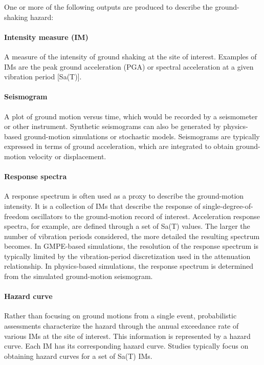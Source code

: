 \noindent One or more of the following outputs are produced to describe the ground-shaking hazard:

\paragraph{Intensity measure (IM)} A measure of the intensity of ground shaking at the site of interest. Examples of IMs are the peak ground acceleration (PGA) or spectral acceleration at a given vibration period [Sa(T)].

\paragraph{Seismogram } A plot of ground motion versus time, which would be recorded by a seismometer or other instrument. Synthetic seismograms can also be generated by physics-based ground-motion simulations or stochastic models. Seismograms are typically expressed in terms of ground acceleration, which are integrated to obtain ground-motion velocity or displacement. 

\paragraph{Response spectra} A response spectrum is often used as a proxy to describe the ground-motion intensity. It is a collection of IMs that describe the response of single-degree-of-freedom oscillators to the ground-motion record of interest. Acceleration response spectra, for example, are defined through a set of Sa(T) values. The larger the number of vibration periods considered, the more detailed the resulting spectrum becomes. In GMPE-based simulations, the resolution of the response spectrum is typically limited by the vibration-period discretization used in the attenuation relationship. In physics-based simulations, the response spectrum is determined from the simulated ground-motion seismogram.

\paragraph{Hazard curve } Rather than focusing on ground motions from a single event, probabilistic assessments characterize the hazard through the annual exceedance rate of various IMs at the site of interest. This information is represented by a hazard curve. Each IM has its corresponding hazard curve. Studies typically focus on obtaining hazard curves for a set of Sa(T) IMs. 

